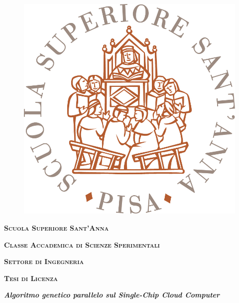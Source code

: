 \begin{titlepage}
\pagestyle{empty}
\begingroup
\vspace*{-8.5\topskip}

\begin{figure}[!h]
\begin{center}
\includegraphics[scale=0.3]{logo_sssup}
\end{center}
\end{figure}

\vspace*{-0.5cm}

\begin{center}
        \large{\bf\expandafter\textsc {Scuola Superiore Sant'Anna}}\par 
		  \large{\bf\expandafter\textsc {Classe Accademica di Scienze Sperimentali}}\par
		  \large{\bf\expandafter\textsc {Settore di Ingegneria}}\par
        \vspace{0.5cm}
        \large{\bf\expandafter\textsc {Tesi di Licenza}}
\end{center}



\vspace{1.5cm}
\begin{center}
        {\LARGE\bf\textit{Algoritmo genetico parallelo sul Single-Chip Cloud Computer}}
\end{center}


\end{titlepage}

